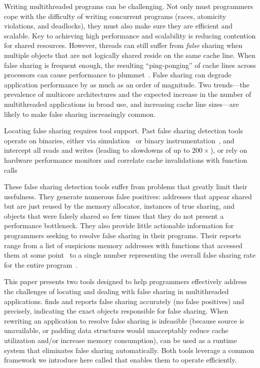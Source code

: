 \label{sec:intro}

Writing multithreaded programs can be challenging. Not only must
programmers cope with the difficulty of writing concurrent programs
(races, atomicity violations, and deadlocks), they must also make sure
they are efficient and scalable. Key to achieving high performance and
scalability is reducing contention for shared resources. However,
threads can still suffer from \emph{false} sharing when multiple
objects that are not logically shared reside on the same cache
line. When false sharing is frequent enough, the resulting
``ping-ponging'' of cache lines across processors can cause
performance to plummet~\cite{falseshare:effect,falseshare:Analysis}.
False sharing can degrade application performance by as much as an
order of magnitude. Two trends---the prevalence of multicore
architectures and the expected increase in the number of multithreaded
applications in broad use, and increasing cache line sizes---are
likely to make false sharing increasingly common.

Locating false sharing requires tool support. Past false sharing
detection tools operate on binaries, either via
simulation~\cite{falseshare:simulator} or binary
instrumentation~\cite{falseshare:binaryinstrumentation1,falseshare:binaryinstrumentation2,zhao:vee:2011}, and intercept all reads and
writes (leading to slowdowns of up to $200\times$), or
rely on hardware performance monitors and correlate cache
invalidations with function calls~\cite{detect:ptu, detect:intel}

These false sharing detection tools suffer from problems that greatly
limit their usefulness. They generate numerous false positives:
addresses that appear shared but are just reused by the memory
allocator, instances of true sharing, and objects that were falsely
shared so few times that they do not present a performance bottleneck.
They also provide little actionable information for programmers
seeking to resolve false sharing in their programs. Their reports
range from a list of suspicious memory addresses with functions that
accessed them at some point~\cite{detect:ptu,falseshare:simulator} to
a single number representing the overall false sharing rate for the
entire
program~\cite{falseshare:binaryinstrumentation1,falseshare:binaryinstrumentation2,zhao:vee:2011}.

This paper presents two tools designed to help programmers effectively address the
challenges of locating and dealing with false sharing in multithreaded
applications. \sheriffdetect{} finds and reports false sharing
accurately (no false positives) and precisely, indicating the exact
objects responsible for false sharing. When rewriting an application
to resolve false sharing is infeasible (because source is unavailable,
or padding data structures would unacceptably reduce cache utilization
and/or increase memory consumption), \sheriffprotect{} can be used as
a runtime system that eliminates false sharing automatically. Both
tools leverage a common framework we introduce here called \sheriff{}
that enables them to operate efficiently.

